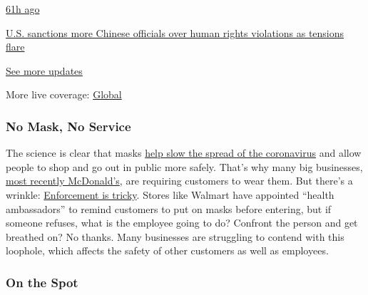 \href{https://www.nytimes3xbfgragh.onion/live/2020/07/31/business/stock-market-today-coronavirus?action=click\&pgtype=Article\&state=default\&region=MAIN_CONTENT_1\&context=storylines_live_updates\#us-sanctions-more-chinese-officials-over-human-rights-violations-as-tensions-flare}{61h
ago}

\href{https://www.nytimes3xbfgragh.onion/live/2020/07/31/business/stock-market-today-coronavirus?action=click\&pgtype=Article\&state=default\&region=MAIN_CONTENT_1\&context=storylines_live_updates\#us-sanctions-more-chinese-officials-over-human-rights-violations-as-tensions-flare}{U.S.
sanctions more Chinese officials over human rights violations as
tensions flare}

\href{https://www.nytimes3xbfgragh.onion/live/2020/07/31/business/stock-market-today-coronavirus?action=click\&pgtype=Article\&state=default\&region=MAIN_CONTENT_1\&context=storylines_live_updates}{See
more updates}

More live coverage:
\href{https://www.nytimes3xbfgragh.onion/2020/08/01/world/coronavirus-covid-19.html?action=click\&pgtype=Article\&state=default\&region=MAIN_CONTENT_1\&context=storylines_live_updates}{Global}

\hypertarget{no-mask-no-service}{%
\subsubsection{No Mask, No Service}\label{no-mask-no-service}}

The science is clear that masks
\href{https://www.nytimes3xbfgragh.onion/2020/07/27/world/coronavirus-covid-19.html}{help
slow the spread of the coronavirus} and allow people to shop and go out
in public more safely. That's why many big businesses,
\href{https://www.nytimes3xbfgragh.onion/article/which-stores-require-masks.html}{most
recently McDonald's}, are requiring customers to wear them. But there's
a wrinkle:
\href{https://www.nytimes3xbfgragh.onion/2020/07/29/business/coronavirus-masks-stores-walmart.html}{Enforcement
is tricky}. Stores like Walmart have appointed ``health ambassadors'' to
remind customers to put on masks before entering, but if someone
refuses, what is the employee going to do? Confront the person and get
breathed on? No thanks. Many businesses are struggling to contend with
this loophole, which affects the safety of other customers as well as
employees.

\hypertarget{on-the-spot}{%
\subsubsection{On the Spot}\label{on-the-spot}}

